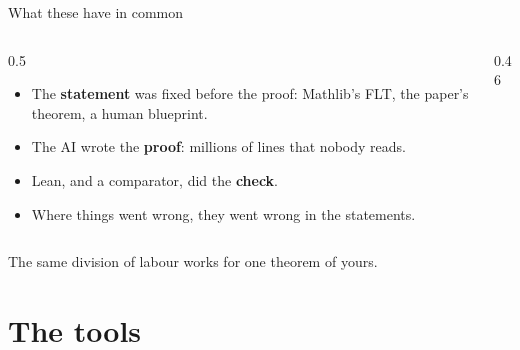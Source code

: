 \documentclass[10pt, aspectratio=169]{beamer}
\begin{document}
\begin{frame}[fragile]{What these have in common}
\begin{columns}[c]
\begin{column}{0.5\textwidth}
\begin{itemize}
\item The \textbf{statement} was fixed before the proof: Mathlib's FLT, the paper's theorem, a human blueprint.
\item The AI wrote the \textbf{proof}: millions of lines that nobody reads.
\item Lean, and a comparator, did the \textbf{check}.
\item Where things went wrong, they went wrong in the statements.
\end{itemize}
\end{column}
\begin{column}{0.46\textwidth}
\centering
{}
\end{column}
\end{columns}

\vspace{0.8em}
\begin{keypoint}
\normalsize The same division of labour works for one theorem of yours.
\end{keypoint}
\end{frame}

\section{The tools}
\end{document}
